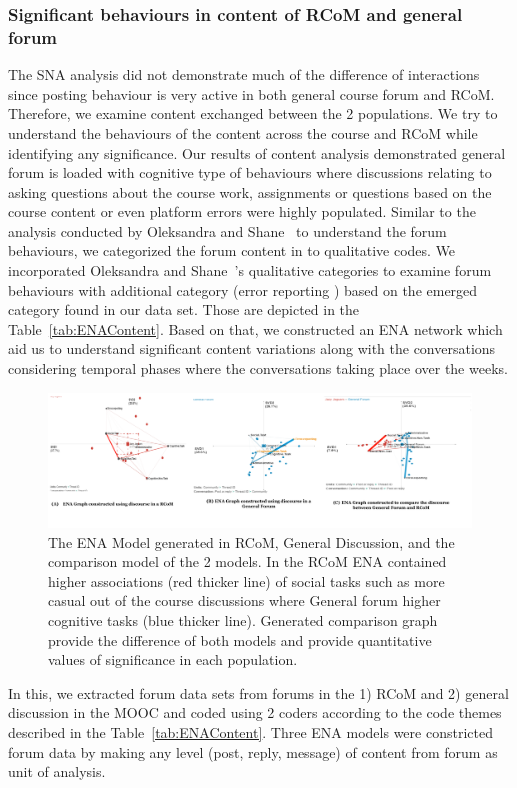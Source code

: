 \documentclass[format=acmsmall, review=false, screen=true]{acmart}
\begin{document}
\subsubsection{Significant behaviours in content of RCoM and general forum}

The SNA analysis did not demonstrate much of the difference of interactions since posting behaviour is very active in both general course forum and RCoM. Therefore, we examine content exchanged between the 2 populations. We try to understand the behaviours of the content across the course and RCoM while identifying any significance. Our results of content analysis demonstrated general forum is loaded with cognitive type of behaviours where discussions relating to asking questions about the course work, assignments or questions based on the course content or even platform errors were highly populated. Similar to the analysis conducted by Oleksandra and Shane~\cite{oleksandra2016untangling} to understand the forum behaviours, we categorized the forum content in to qualitative codes. We incorporated Oleksandra and Shane~\cite{oleksandra2016untangling}'s qualitative categories to examine forum behaviours with additional category (error reporting ) based on the emerged category found in our data set. Those are depicted in the Table~\ref{tab:ENAContent}. Based on that, we constructed an ENA network which aid us to understand significant content variations along with the conversations considering temporal phases where the conversations taking place over the weeks. 

\begin{figure}[h]
 \centering
 \includegraphics[width=\linewidth]{images/ENADiagrams.png}
 \caption{The ENA Model generated in RCoM, General Discussion, and the comparison model of the 2 models. In the RCoM ENA contained higher associations (red thicker line) of social tasks such as more casual out of the course discussions where General forum higher cognitive tasks (blue thicker line). Generated comparison graph provide the difference of both models and provide quantitative values of significance in each population.}
  \vspace{-1.5em}
 \label{fig:ENADiagrams}
\end{figure}
In this, we extracted forum data sets from forums in the 1) RCoM and 2) general discussion in the MOOC and coded using 2 coders according to the code themes described in the Table~\ref{tab:ENAContent}. Three ENA models were constricted forum data by making any level (post, reply, message) of content from forum as unit of analysis.
\end{document}
